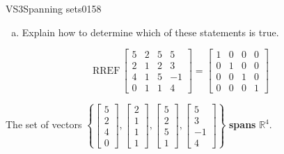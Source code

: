 \begin{exercise}{VS3}{Spanning sets}{0158}
\begin{exerciseStatement}
\begin{enumerate}[(a)]
\begin{itemize}
 
\end{itemize}

     
\item  

 Explain how to determine which of these statements is true. 

 
\end{enumerate}

     \end{exerciseStatement}
 \begin{exerciseAnswer} 

 \[
\mathrm{RREF}\, \left[\begin{array}{cccc}
5 & 2 & 5 & 5 \\
2 & 1 & 2 & 3 \\
4 & 1 & 5 & -1 \\
0 & 1 & 1 & 4
\end{array}\right] = \left[\begin{array}{cccc}
1 & 0 & 0 & 0 \\
0 & 1 & 0 & 0 \\
0 & 0 & 1 & 0 \\
0 & 0 & 0 & 1
\end{array}\right]
            \] 

 

 The set of vectors \(\left\{ \left[\begin{array}{c}
5 \\
2 \\
4 \\
0
\end{array}\right] , \left[\begin{array}{c}
2 \\
1 \\
1 \\
1
\end{array}\right] , \left[\begin{array}{c}
5 \\
2 \\
5 \\
1
\end{array}\right] , \left[\begin{array}{c}
5 \\
3 \\
-1 \\
4
\end{array}\right] \right\}\) \textbf{spans} \(\mathbb{R}^4\). 

 \end{exerciseAnswer}
 \end{exercise}



